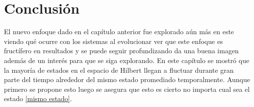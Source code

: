 \section{Conclusión}

El nuevo enfoque dado en el capítulo anterior fue explorado aún más en este viendo qué ocurre con los sistemas al evolucionar ver que este enfoque es fructífero  en resultados y se puede seguir profundizando da una buena imagen además de un interés para que se siga explorando. En este capítulo se mostró que la mayoría de estados en el espacio de Hilbert llegan a fluctuar durante gran parte del tiempo alrededor del mismo estado promediado temporalmente. Aunque primero se propone esto luego se asegura que esto es cierto no importa cual sea el estado \ref{mismo estado}. 


